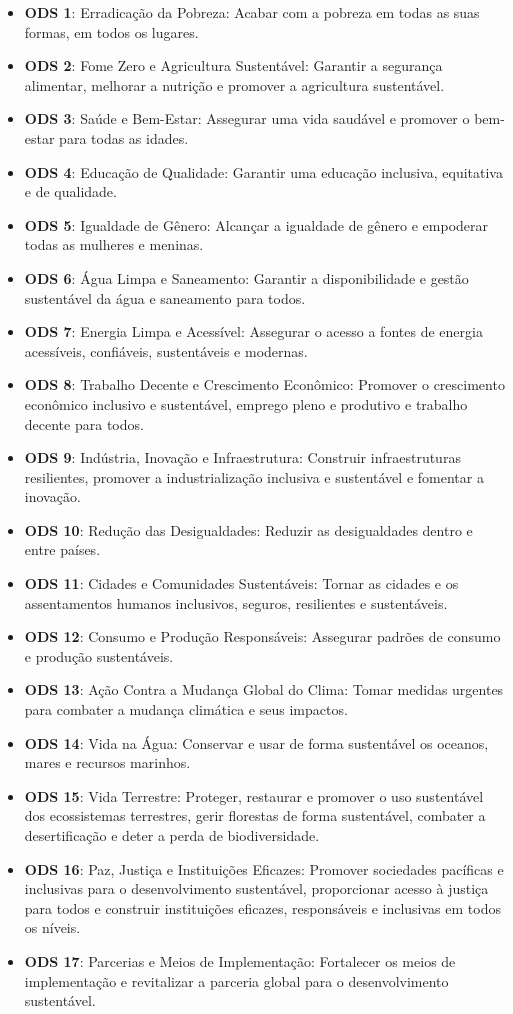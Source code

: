 \begin{itemize}
    \item \textbf{ODS 1}: Erradicação da Pobreza: Acabar com a pobreza em todas as suas formas, em todos os lugares.
    \item \textbf{ODS 2}: Fome Zero e Agricultura Sustentável: Garantir a segurança alimentar, melhorar a nutrição e promover a agricultura sustentável.
    \item \textbf{ODS 3}: Saúde e Bem-Estar: Assegurar uma vida saudável e promover o bem-estar para todas as idades.
    \item \textbf{ODS 4}: Educação de Qualidade: Garantir uma educação inclusiva, equitativa e de qualidade.
    \item \textbf{ODS 5}: Igualdade de Gênero: Alcançar a igualdade de gênero e empoderar todas as mulheres e meninas.
    \item \textbf{ODS 6}: Água Limpa e Saneamento: Garantir a disponibilidade e gestão sustentável da água e saneamento para todos.
    \item \textbf{ODS 7}: Energia Limpa e Acessível: Assegurar o acesso a fontes de energia acessíveis, confiáveis, sustentáveis e modernas.
    \item \textbf{ODS 8}: Trabalho Decente e Crescimento Econômico: Promover o crescimento econômico inclusivo e sustentável, emprego pleno e produtivo e trabalho decente para todos.
    \item \textbf{ODS 9}: Indústria, Inovação e Infraestrutura: Construir infraestruturas resilientes, promover a industrialização inclusiva e sustentável e fomentar a inovação.
    \item \textbf{ODS 10}: Redução das Desigualdades: Reduzir as desigualdades dentro e entre países.
    \item \textbf{ODS 11}: Cidades e Comunidades Sustentáveis: Tornar as cidades e os assentamentos humanos inclusivos, seguros, resilientes e sustentáveis.
    \item \textbf{ODS 12}: Consumo e Produção Responsáveis: Assegurar padrões de consumo e produção sustentáveis.
    \item \textbf{ODS 13}: Ação Contra a Mudança Global do Clima: Tomar medidas urgentes para combater a mudança climática e seus impactos.
    \item \textbf{ODS 14}: Vida na Água: Conservar e usar de forma sustentável os oceanos, mares e recursos marinhos.
    \item \textbf{ODS 15}: Vida Terrestre: Proteger, restaurar e promover o uso sustentável dos ecossistemas terrestres, gerir florestas de forma sustentável, combater a desertificação e deter a perda de biodiversidade.
    \item \textbf{ODS 16}: Paz, Justiça e Instituições Eficazes: Promover sociedades pacíficas e inclusivas para o desenvolvimento sustentável, proporcionar acesso à justiça para todos e construir instituições eficazes, responsáveis e inclusivas em todos os níveis.
    \item \textbf{ODS 17}: Parcerias e Meios de Implementação: Fortalecer os meios de implementação e revitalizar a parceria global para o desenvolvimento sustentável.
\end{itemize}


